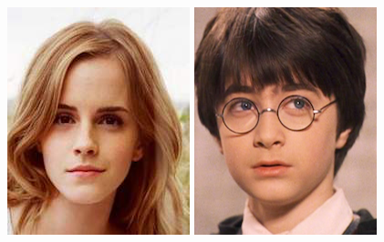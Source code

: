 \documentclass[10pt,twocolumn,letterpaper]{article}
\begin{document}
\begin{figure}[htbp]
{\begin{minipage}[b]{0.22\linewidth}
\includegraphics[width=0.99\linewidth]{img/real_world_photos/r3.png}
\includegraphics[width=0.99\linewidth]{img/real_world_photos/r4.png}

\end{minipage}}
\end{figure}
\end{document}
